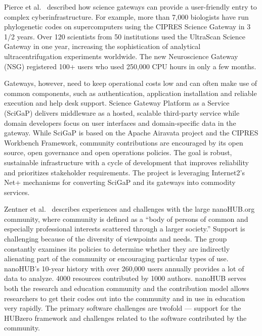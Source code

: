 \documentclass[11pt, oneside]{amsart}
\newcommand{\toolname}[1] {\textsf{#1}}
\begin{document}
Pierce et al.~\cite{Pierce2_WSSSPE} described how science gateways can
provide a user-friendly entry to complex cyberinfrastructure. For
example, more than 7,000 biologists have run phylogenetic codes on
supercomputers using the \toolname{CIPRES} Science Gateway in 3 1/2
years. Over 120 scientists from 50 institutions used the
\toolname{UltraScan Science Gateway} in one year, increasing the
sophistication of analytical ultracentrifugation experiments
worldwide. The new Neuroscience Gateway (\toolname{NSG}) registered
100+ users who used 250,000 CPU hours in only a few months.

Gateways, however, need to keep operational costs low and can often
make use of common components, such as authentication, application
installation and reliable execution and help desk support. Science
Gateway Platform as a Service (\toolname{SciGaP}) delivers middleware
as a hosted, scalable third-party service while domain developers
focus on user interfaces and domain-specific data in the gateway.
While \toolname{SciGaP} is based on the \toolname{Apache Airavata}
project and the \toolname{CIPRES} Workbench Framework, community
contributions are encouraged by its open source, open governance and
open operations policies. The goal is robust, sustainable
infrastructure with a cycle of development that improves reliability
and prioritizes stakeholder requirements. The project is leveraging
Internet2's \toolname{Net+} mechanisms for converting
\toolname{SciGaP} and its gateways into commodity services.

Zentner et al.~\cite{Zentner_WSSSPE} describes experiences and
challenges with the large \toolname{nanoHUB.org} community, where
community is defined as a ``body of persons of common and especially
professional interests scattered through a larger society.'' Support
is challenging because of the diversity of viewpoints and needs. The
group constantly examines its policies to determine whether they are
indirectly alienating part of the community or encouraging particular
types of use.
%
\toolname{nanoHUB}'s 10-year history with over 260,000 users annually
provides a lot of data to analyze. 4000 resources contributed by 1000
authors. \toolname{nanoHUB} serves both the research and education
community and the contribution model allows researchers to get their
codes out into the community and in use in education very rapidly. The
primary software challenges are twofold --- support for the
\toolname{HUBzero} framework and challenges related to the software
contributed by the community.
\end{document}
